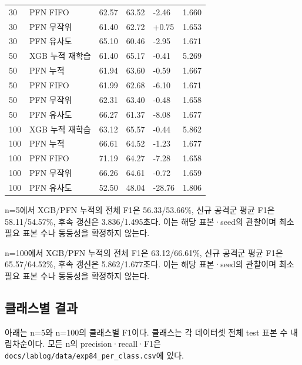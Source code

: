 \begin{longtable}
{}30 & PFN FIFO & 62.57 & 63.52 & -2.46 & 1.660 \\
{}30 & PFN 무작위 & 61.40 & 62.72 & +\allowbreak{}0.75 & 1.653 \\
{}30 & PFN 유사도 & 65.10 & 60.46 & -2.95 & 1.671 \\
{}50 & XGB 누적 재학습 & 61.40 & 65.17 & -0.41 & 5.269 \\
{}50 & PFN 누적 & 61.94 & 63.60 & -0.59 & 1.667 \\
{}50 & PFN FIFO & 61.99 & 62.68 & -6.10 & 1.671 \\
{}50 & PFN 무작위 & 62.31 & 63.40 & -0.48 & 1.658 \\
{}50 & PFN 유사도 & 66.27 & 61.37 & -8.08 & 1.677 \\
{}100 & XGB 누적 재학습 & 63.12 & 65.57 & -0.44 & 5.862 \\
{}100 & PFN 누적 & 66.61 & 64.52 & -1.23 & 1.677 \\
{}100 & PFN FIFO & 71.19 & 64.27 & -7.28 & 1.658 \\
{}100 & PFN 무작위 & 66.26 & 64.61 & -0.72 & 1.659 \\
{}100 & PFN 유사도 & 52.50 & 48.04 & -28.76 & 1.806 \\
\bottomrule
\end{longtable}
\endgroup
n=\allowbreak{}5에서 XGB/\allowbreak{}PFN 누적의 전체 F1은 56.33/\allowbreak{}53.66\%, 신규 공격군 평균 F1은 58.11/\allowbreak{}54.57\%, 후속 갱신은 3.836/\allowbreak{}1.495초다. 이는 해당 표본·seed의 관찰이며 최소 필요 표본 수나 동등성을 확정하지 않는다.

n=\allowbreak{}100에서 XGB/\allowbreak{}PFN 누적의 전체 F1은 63.12/\allowbreak{}66.61\%, 신규 공격군 평균 F1은 65.57/\allowbreak{}64.52\%, 후속 갱신은 5.862/\allowbreak{}1.677초다. 이는 해당 표본·seed의 관찰이며 최소 필요 표본 수나 동등성을 확정하지 않는다.

\subsection{클래스별 결과}
아래는 n=\allowbreak{}5와 n=\allowbreak{}100의 클래스별 F1이다. 클래스는 각 데이터셋 전체 test 표본 수 내림차순이다. 모든 n의 precision·recall·F1은 \texttt{docs/\allowbreak{}\allowbreak{}lab\allowbreak{}log/\allowbreak{}\allowbreak{}data\allowbreak{}/\allowbreak{}\allowbreak{}exp84\_\allowbreak{}\allowbreak{}p\allowbreak{}er\_\allowbreak{}\allowbreak{}class\allowbreak{}.\allowbreak{}csv}에 있다.

